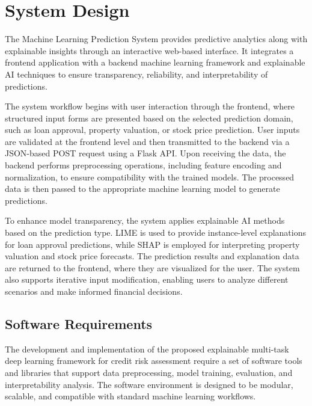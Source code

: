 
\section{System Design}

The Machine Learning Prediction System provides predictive analytics along with explainable insights through an interactive web-based interface. It integrates a frontend application with a backend machine learning framework and explainable AI techniques to ensure transparency, reliability, and interpretability of predictions.

The system workflow begins with user interaction through the frontend, where structured input forms are presented based on the selected prediction domain, such as loan approval, property valuation, or stock price prediction. User inputs are validated at the frontend level and then transmitted to the backend via a JSON-based POST request using a Flask API. Upon receiving the data, the backend performs preprocessing operations, including feature encoding and normalization, to ensure compatibility with the trained models. The processed data is then passed to the appropriate machine learning model to generate predictions.

To enhance model transparency, the system applies explainable AI methods based on the prediction type. LIME is used to provide instance-level explanations for loan approval predictions, while SHAP is employed for interpreting property valuation and stock price forecasts. The prediction results and explanation data are returned to the frontend, where they are visualized for the user. The system also supports iterative input modification, enabling users to analyze different scenarios and make informed financial decisions.

\subsection{Software Requirements}

The development and implementation of the proposed explainable multi-task deep learning framework for credit risk assessment require a set of software tools and libraries that support data preprocessing, model training, evaluation, and interpretability analysis. The software environment is designed to be modular, scalable, and compatible with standard machine learning workflows.

